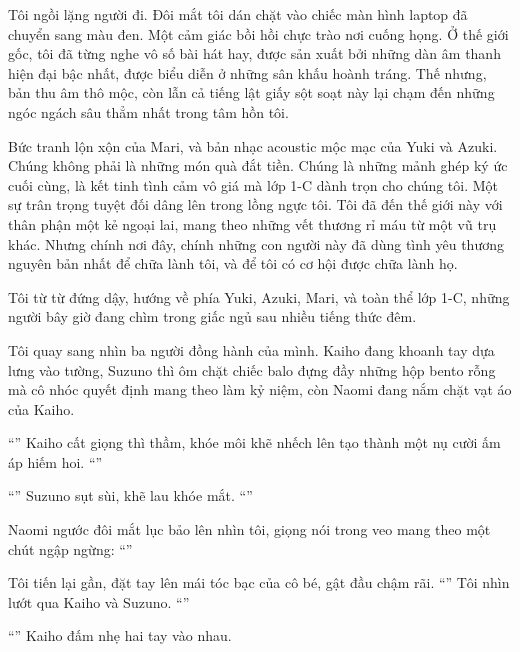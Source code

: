 \documentclass[../main.tex]{subfiles}
\begin{document}
Tôi ngồi lặng người đi. Đôi mắt tôi dán chặt vào chiếc màn hình laptop đã chuyển sang màu đen. Một cảm giác bồi hồi chực trào nơi cuống họng. Ở thế giới gốc, tôi đã từng nghe vô số bài hát hay, được sản xuất bởi những dàn âm thanh hiện đại bậc nhất, được biểu diễn ở những sân khấu hoành tráng. Thế nhưng, bản thu âm thô mộc, còn lẫn cả tiếng lật giấy sột soạt này lại chạm đến những ngóc ngách sâu thẳm nhất trong tâm hồn tôi.

Bức tranh lộn xộn của Mari, và bản nhạc acoustic mộc mạc của Yuki và Azuki. Chúng không phải là những món quà đắt tiền. Chúng là những mảnh ghép ký ức cuối cùng, là kết tinh tình cảm vô giá mà lớp 1-C dành trọn cho chúng tôi. Một sự trân trọng tuyệt đối dâng lên trong lồng ngực tôi. Tôi đã đến thế giới này với thân phận một kẻ ngoại lai, mang theo những vết thương rỉ máu từ một vũ trụ khác. Nhưng chính nơi đây, chính những con người này đã dùng tình yêu thương nguyên bản nhất để chữa lành tôi, và để tôi có cơ hội được chữa lành họ.

Tôi từ từ đứng dậy, hướng về phía Yuki, Azuki, Mari, và toàn thể lớp 1-C, những người bây giờ đang chìm trong giấc ngủ sau nhiều tiếng thức đêm.

Tôi quay sang nhìn ba người đồng hành của mình. Kaiho đang khoanh tay dựa lưng vào tường, Suzuno thì ôm chặt chiếc balo đựng đầy những hộp bento rỗng mà cô nhóc quyết định mang theo làm kỷ niệm, còn Naomi đang nắm chặt vạt áo của Kaiho.

``'' Kaiho cất giọng thì thầm, khóe môi khẽ nhếch lên tạo thành một nụ cười ấm áp hiếm hoi. ``''

``'' Suzuno sụt sùi, khẽ lau khóe mắt. ``''

Naomi ngước đôi mắt lục bảo lên nhìn tôi, giọng nói trong veo mang theo một chút ngập ngừng: ``''

Tôi tiến lại gần, đặt tay lên mái tóc bạc của cô bé, gật đầu chậm rãi. ``'' Tôi nhìn lướt qua Kaiho và Suzuno. ``''

``'' Kaiho đấm nhẹ hai tay vào nhau.
\end{document}
